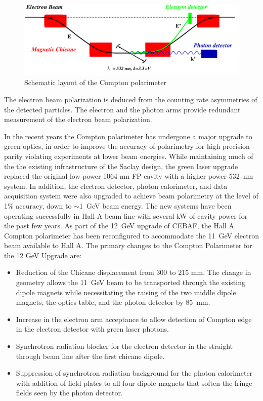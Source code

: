  \begin{figure}[htp]
    \begin{center}
        \includegraphics*[angle=0,width=\textwidth]{compton_setup}
    \end{center}
    \caption[compton:Schematic  layout]{
            Schematic layout of the  Compton polarimeter
            }
    \label{fig:compton_setup}
 \end{figure}

The electron beam polarization is deduced from the counting rate asymmetries of 
the detected particles. The electron and the photon arms provide redundant measurement of the electron beam polarization.

In the recent years the Compton polarimeter has undergone a major upgrade\cite{compton_upgrade} to green optics, in order to improve the accuracy of polarimetry  for  high precision parity violating experiments at lower beam energies. While maintaining much of the 
the existing infrastructure of the  Saclay design, the green laser upgrade replaced  the original low power 1064 nm  FP cavity  with  a higher power 532~nm system. In addition, the electron detector, photon calorimeter, and data acquisition system  were also  upgraded to achieve beam 
polarimetry at the level of  1\% accuracy, down to $\sim$1~GeV beam energy. The new systems have been  operating  successfully in Hall A beam line 
with  several  kW of cavity power for the past few years. As part of the  12~GeV upgrade of CEBAF, the Hall A Compton polarimeter has been reconfigured  to accommodate the 11~GeV electron beam available to Hall A. The primary changes to the Compton Polarimeter for the 12 GeV Upgrade are:
\begin{itemize}
\item Reduction of the Chicane displacement from 300 to 215 mm.  The change in geometry allows the 11~GeV beam to be transported through the existing dipole magnets while necessitating the raising of the two middle dipole magnets, the optics table, and the photon detector by 85~mm.
\item Increase in  the electron arm acceptance to allow detection of Compton edge in the electron detector with green laser photons.
\item Synchrotron radiation blocker for the electron detector in the straight through beam line after the first chicane dipole. 
\item Suppression of synchrotron radiation background for the  photon calorimeter with addition of field plates to all four dipole magnets that soften the fringe fields seen by the photon detector.
\end{itemize}

